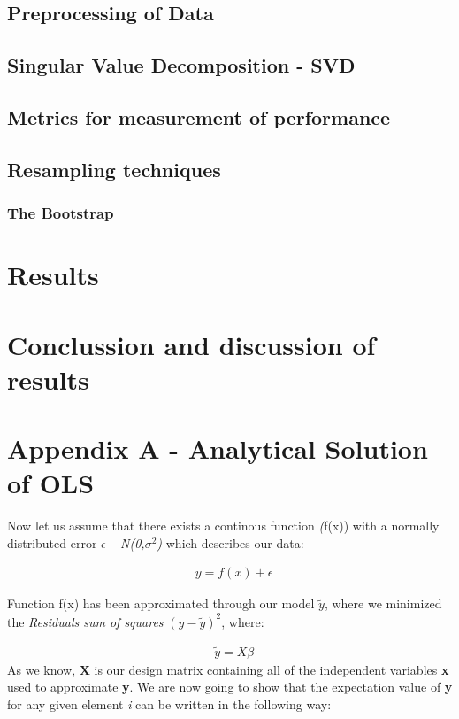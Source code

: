 \documentclass[a4paper, 10pt]{article}
\begin{document}
\subsection{Preprocessing of Data}

\subsection{Singular Value Decomposition - SVD}

\subsection{Metrics for measurement of performance}

\subsection{Resampling techniques}

\subsubsection{The Bootstrap}


\section{Results}

\section{Conclussion and discussion of results}


\section{Appendix A - Analytical Solution of OLS}
Now let us assume that there exists a continous function \emph(f(x)) with a normally distributed error $\epsilon$ ~ \emph{N(0,$\sigma^2$)} which describes our data: 

\begin{gather*}
	\textbf{ $y=f(x) + \epsilon$}
\end{gather*}

Function f(x) has been approximated through our model \textbf{$\tilde{y}$}, where we minimized the \emph{Residuals sum of squares} \textbf{$(y-\tilde{y})^2$}, where: 

\begin{gather*}
	\textbf{ $\tilde{y}=X\beta$}
\end{gather*}
As we know, \textbf{X} is our design matrix containing all of the independent variables \textbf{x} used to approximate \textbf{y}. We are now going to show that the expectation value of \textbf{y} for any given element \emph{i} can be written in the following way: 
\end{document}
